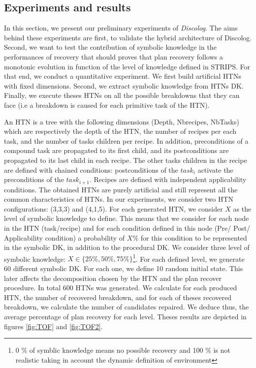\documentclass{llncs}
\begin{document}
			\subsection{Experiments and results}
			\par  In this section, we present our preliminary experiments of \emph{Discolog}. The aims behind these  experiments are first, to validate the hybrid architecture of Discolog. Second, we want to test the contribution of symbolic knowledge in the performances of recovery that should proves that plan recovery follows a monotonic evolution in function of the level of knowledge defined in STRIPS. For that end, we conduct a quantitative experiment. We first build artificial HTNs with fixed dimensions. Second, we extract symbolic knowledge from HTNs DK. Finally, we execute theses HTNs on all the possible breakdowns that they can face (i.e a breakdown is caused for each primitive task of the HTN).
			\par  An HTN is a tree with the following dimensions (Depth, Nbrecipes, NbTasks) which are respectively the depth of the HTN, the number of recipes per each task, and the number of tasks children per recipe. In addition,	preconditions of a compound task are propagated to its first child, and its postconditions are propagated to its last child in each recipe. The other tasks children in the recipe are defined with chained conditions:  postconditions of the $task_i$ activate the preconditions of the $task_{i+1}$. Recipes are defined with independent applicability conditions. The obtained HTNs are purely artificial and still represent all the common characteristics of HTNs.  In our experiments, we consider two HTN configurations: (3,3,3) and (4,1,5).  For each generated HTN, we consider $X$ as the level of symbolic knowledge to define. This means that we consider  for each node in the HTN (task/recipe) and for each condition defined in this node (Pre/ Post/ Applicability condition) a probability of $X\%$ for this condition  to be represented in the symbolic DK, in addition to the procedural DK. We consider three level of symbolic knowledge: $X \in \{ 25\%, 50\%, 75 \%\}$\footnote{0 \% of symblic knowledge means no possible recovery and 100 \% is not realistic taking in account the dynamic definition of environment}. For each defined level, we generate 60 different symbolic DK. For each one, we define 10 random initial state. This later affects the decomposition chosen by the HTN and the plan recover procedure. In total 600 HTNs was generated. We calculate for each produced HTN, the number of recovered breakdown, and for each of theses recovered breakdown, we calculate the number of candidates repaired. We deduce thus, the average percentage of plan recovery for each level. Theses results are depicted in figures \ref{fig:TOF} and \ref{fig:TOF2}.
		
\end{document}

